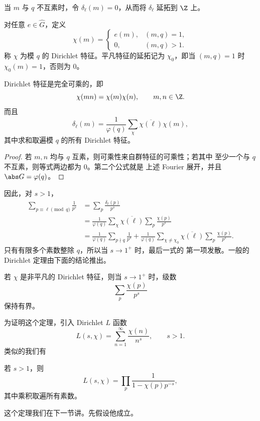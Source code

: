 当 $m$ 与 $q$ 不互素时，令 $\delta_\ell(m)=0$，从而将
$\delta_\ell$ 延拓到 $\Z$ 上。\begin{definition}
	对任意 $e\in\widehat G$，定义
\[
\chi(m)=
\begin{cases}
	e(m),&(m,q)=1,\\
	0,&(m,q)>1.
\end{cases}
\]
称 $\chi$ 为模 $q$ 的 Dirichlet 特征。平凡特征的延拓记为
$\chi_0$，即当 $(m,q)=1$ 时 $\chi_0(m)=1$，否则为 $0$。
\end{definition}

\begin{lemma}\label{lem:dirichlet-character-multiplicativity-delta}
	Dirichlet 特征是完全可乘的，即
	\[
	\chi(mn)=\chi(m)\chi(n),\qquad m,n\in\Z.
	\]
	而且
	\[
	\delta_\ell(m)=\frac1{\varphi(q)}
	\sum_\chi\overline{\chi(\ell)}\chi(m),
	\]
	其中求和取遍模 $q$ 的所有 Dirichlet 特征。
\end{lemma}

\begin{proof}
	若 $m,n$ 均与 $q$ 互素，则可乘性来自群特征的可乘性；若其中
	至少一个与 $q$ 不互素，则等式两边都为 $0$。第二个公式就是
	上述 Fourier 展开，并且 $\abs G=\varphi(q)$。
\end{proof}

因此，对 $s>1$，
\begin{equation}\label{eq:dirichlet-prime-sum-decomposition}
\begin{aligned}
\sum_{p\equiv\ell\pmod q}\frac1{p^s}
&=\sum_p\frac{\delta_\ell(p)}{p^s}\\
&=\frac1{\varphi(q)}
\sum_\chi\overline{\chi(\ell)}\sum_p\frac{\chi(p)}{p^s}\\
&=\frac1{\varphi(q)}\sum_{p\nmid q}\frac1{p^s}
+\frac1{\varphi(q)}
\sum_{\chi\neq\chi_0}\overline{\chi(\ell)}
\sum_p\frac{\chi(p)}{p^s}.
\end{aligned}
\end{equation}
只有有限多个素数整除 $q$，所以当 $s\to1^+$ 时，最后一式的
第一项发散。一般的 Dirichlet 定理由下面的结论推出。

\begin{theorem}\label{thm:nonprincipal-prime-character-sum-bounded}
	若 $\chi$ 是非平凡的 Dirichlet 特征，则当 $s\to1^+$ 时，级数
	\[
	\sum_p\frac{\chi(p)}{p^s}
	\]
	保持有界。
\end{theorem}

为证明这个定理，引入 Dirichlet $L$ 函数
\[
L(s,\chi)=\sum_{n=1}^{\infty}\frac{\chi(n)}{n^s},
\qquad s>1.
\]
类似的我们有
\begin{theorem}
	\label{thm:dirichlet-L-euler-product}
	若 $s>1$，则
	\[
	L(s,\chi)=\prod_p\frac1{1-\chi(p)p^{-s}},
	\]
	其中乘积取遍所有素数。
\end{theorem}
这个定理我们在下一节讲。先假设他成立。


